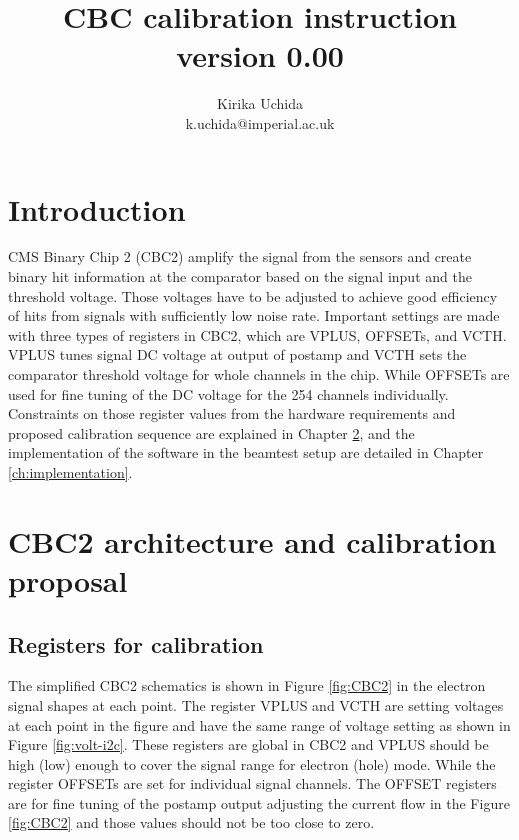 \documentclass[11pt,a4paper]{article}
\begin{document}
\title{CBC calibration instruction \\ version 0.00}

\author{Kirika Uchida\\
	k.uchida@imperial.ac.uk}

	\maketitle
	\tableofcontents
	\listoffigures %
	\listoftables  %

	\section{Introduction}
	CMS Binary Chip 2 (CBC2) amplify the signal from the sensors and create binary hit information at the comparator 
	based on the signal input and the threshold voltage. 
	Those voltages have to be adjusted to achieve good efficiency of hits from signals with sufficiently low noise rate. 
	Important settings are made with three types of registers in CBC2, which are VPLUS, OFFSETs, and VCTH.  
	VPLUS tunes signal DC voltage at output of postamp and VCTH sets the comparator threshold voltage for whole channels in the chip.  
	While OFFSETs are used for fine tuning of the DC voltage for the 254 channels individually. 
	Constraints on those register values from the hardware requirements and 
	proposed calibration sequence are explained in Chapter \ref{ch:architecture-proposal}, 
	and the implementation of the software in the beamtest setup are detailed in Chapter \ref{ch:implementation}.  

	\section{CBC2 architecture and calibration proposal}\label{ch:architecture-proposal}
	\subsection{Registers for calibration}\label{sec:reg}
	The simplified CBC2 schematics is shown in Figure \ref{fig:CBC2} in the electron signal shapes at each point.  
	The register VPLUS and VCTH are setting voltages at each point in the figure and have the same range of voltage setting
	as shown in Figure \ref{fig:volt-i2c}. 
	These registers are global in CBC2 and VPLUS should be high (low) enough to cover the signal range for electron (hole) mode.
	While the register OFFSETs are set for individual signal channels. 
	The OFFSET registers are for fine tuning of the postamp output adjusting the current flow in the Figure \ref{fig:CBC2} 
	and those values should not be too close to zero. 
\end{document}
